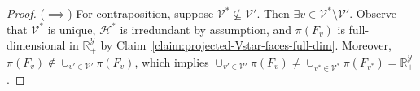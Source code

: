 \documentclass[twoside,11pt]{article}
\newcommand{\Comments}{1}
\newcommand{\mynote}[2]{\ifnum\Comments=1\textcolor{#1}{#2}\fi}
\newcommand{\raf}[1]{\mynote{darkgreen}{[RF: #1]}}
\newcommand{\reals}{\mathbb{R}}
\renewcommand{\H}{\mathcal{H}}
\newcommand{\V}{\mathcal{V}}
\newcommand{\Y}{\mathcal{Y}}
\newcommand{\inprod}[2]{\langle #1, #2 \rangle}%
\newcommand{\relint}{\mathrm{relint}}
\newcommand{\hyp}{\mathrm{hypo}}
\begin{document}
\begin{proof}
	
	
	
	($\implies$) 
	For contraposition, suppose $\V^* \not \subseteq \V'$.
	Then $\exists v \in \V^* \setminus \V'$.
	Observe that $\V^*$ is unique, $\H^*$ is irredundant by assumption, and $\pi(F_v)$ is full-dimensional in $\reals^\Y_+$ by Claim~\ref{claim:projected-Vstar-faces-full-dim}.
	Moreover, $\pi(F_v) \not \in \cup_{v' \in \V'} \pi(F_v)$, which implies $\cup_{v' \in \V'} \pi(F_v) \neq \cup_{v^* \in \V^*} \pi(F_{v^*}) = \reals^\Y_+$.
	
%	
%	
	

\end{proof}
\end{document}
